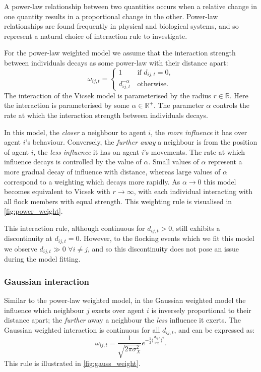 A power-law relationship between two quantities occurs when a relative
change in one quantity results in a proportional change in the other.
Power-law relationships are found frequently in physical and biological
systems, and so represent a natural choice of interaction rule to investigate.

For the power-law weighted model we assume that the interaction strength
between individuals decays as some power-law with their distance
apart:
\begin{equation}
  \label{eq:power_law_interaction}
  \omega_{ij,t} =
  \begin{cases}
    1                  & \, \text{if } d_{ij,t} = 0, \\
	d_{ij,t}^{-\alpha} & \, \text{otherwise}.
  \end{cases}
\end{equation}
The interaction of the Vicsek model is parameterised by the radius
$r\in\mathbb{R}$. Here the interaction is parameterised by some
$\alpha\in\mathbb{R}^+$. The parameter $\alpha$ controls the rate at which the
interaction strength between individuals decays. 

In this model, the \emph{closer} a neighbour to agent $i$, the \emph{more
influence} it has over agent $i$'s behaviour. Conversely, the \emph{further
away} a neighbour is from the position of agent $i$, the \emph{less influence}
it has on agent $i$'s movements. The rate at which influence decays is
controlled by the value of $\alpha$. Small values of $\alpha$ represent a more
gradual decay of influence with distance, whereas large values of $\alpha$
correspond to a weighting which decays more rapidly. As $\alpha \rightarrow 0$
this model becomes equivalent to Vicsek with $r \rightarrow \infty$, with each
individual interacting with all flock members with equal strength. This
weighting rule is visualised in \cref{fig:power_weight}.

This interaction rule, although continuous for $d_{ij,t} > 0$, still exhibits a
discontinuity at $d_{ij,t}=0$. However, to the flocking events which we fit
this model we observe $d_{ij,t}\gg0$ $\forall i \neq j$, and so this
discontinuity does not pose an issue during the model fitting.

\subsubsection{Gaussian interaction}

Similar to the power-law weighted model, in the Gaussian weighted model the
influence which neighbour $j$ exerts over agent $i$ is inversely proportional
to their distance apart; the \emph{further} away a neighbour the \emph{less}
influence it exerts. The Gaussian weighted interaction is continuous for all
$d_{ij,t}$, and can be expressed as:
\begin{equation}
  \label{eq:gaussian_interaction}
  \omega_{ij,t} =
	\frac{1}{\sqrt{2\pi\sigma_X^2}}
	e^{-\frac{1}{2}\big(\frac{d_{ij,t}}{\sigma_X}\big)^2}.
\end{equation}
This rule is illustrated in \cref{fig:gauss_weight}.

